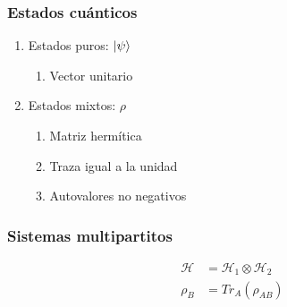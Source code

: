 \documentclass[xetex,mathserif,serif]{beamer}
\begin{document}
\begin{frame}
    \frametitle{Estados cuánticos}

    \begin{enumerate}
        \item Estados puros: $\ket{\psi}$
            \begin{enumerate}
                \item Vector unitario
            \end{enumerate}
        \item Estados mixtos: $\rho$
            \begin{enumerate}
                \item Matriz hermítica
                \item Traza igual a la unidad
                \item Autovalores no negativos
            \end{enumerate}
    \end{enumerate}

\end{frame}

\begin{frame}
    \frametitle{Sistemas multipartitos}

    \begin{align}
        \mathcal{H} &= \mathcal{H}_1 \otimes \mathcal{H}_2 \\
        \rho_B &= Tr_A(\rho_{AB})
    \end{align}


\end{frame}
\end{document}
